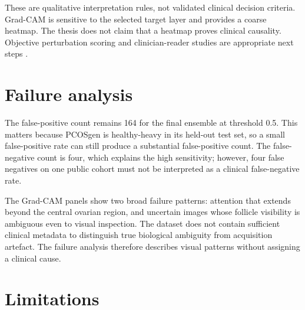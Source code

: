 \documentclass[../preamble.tex]{subfiles}
\begin{document}
These are qualitative interpretation rules, not validated clinical decision
criteria. Grad-CAM is sensitive to the selected target layer and provides a
coarse heatmap. The thesis does not claim that a heatmap proves clinical
causality. Objective perturbation scoring and clinician-reader studies are
appropriate next steps \cite{samek2017,tjoa2021}.

\section{Failure analysis}
\label{sec:discussion-failure}

The false-positive count remains 164 for the final ensemble at threshold 0.5.
This matters because PCOSgen is healthy-heavy in its held-out test set, so a
small false-positive rate can still produce a substantial false-positive
count. The false-negative count is four, which explains the high sensitivity;
however, four false negatives on one public cohort must not be interpreted as
a clinical false-negative rate.

The Grad-CAM panels show two broad failure patterns: attention that extends
beyond the central ovarian region, and uncertain images whose follicle
visibility is ambiguous even to visual inspection. The dataset does not
contain sufficient clinical metadata to distinguish true biological ambiguity
from acquisition artefact. The failure analysis therefore describes visual
patterns without assigning a clinical cause.

\section{Limitations}
\label{sec:discussion-limitations}
\end{document}
